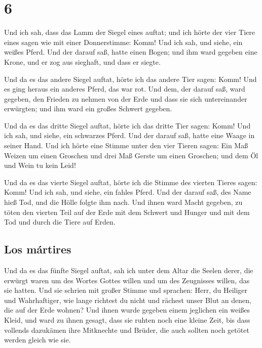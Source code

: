 \hypertarget{section-5}{%
\section{6}\label{section-5}}

 Und ich sah, dass das Lamm der Siegel eines auftat; und
ich hörte der vier Tiere eines sagen wie mit einer Donnerstimme: Komm!
 Und ich sah, und siehe, ein weißes Pferd. Und der darauf
saß, hatte einen Bogen; und ihm ward gegeben eine Krone, und er zog aus
sieghaft, und dass er siegte.

 Und da es das andere Siegel auftat, hörte ich das andere
Tier sagen: Komm!  Und es ging heraus ein anderes Pferd,
das war rot. Und dem, der darauf saß, ward gegeben, den Frieden zu
nehmen von der Erde und dass sie sich untereinander erwürgten; und ihm
ward ein großes Schwert gegeben.

 Und da es das dritte Siegel auftat, hörte ich das dritte
Tier sagen: Komm! Und ich sah, und siehe, ein schwarzes Pferd. Und der
darauf saß, hatte eine Waage in seiner Hand.  Und ich
hörte eine Stimme unter den vier Tieren sagen: Ein Maß Weizen um einen
Groschen und drei Maß Gerste um einen Groschen; und dem Öl und Wein tu
kein Leid!

 Und da es das vierte Siegel auftat, hörte ich die Stimme
des vierten Tieres sagen: Komm!  Und ich sah, und siehe,
ein fahles Pferd. Und der darauf saß, des Name hieß Tod, und die Hölle
folgte ihm nach. Und ihnen ward Macht gegeben, zu töten den vierten Teil
auf der Erde mit dem Schwert und Hunger und mit dem Tod und durch die
Tiere auf Erden.

\hypertarget{los-muxe1rtires}{%
\subsection{Los mártires}\label{los-muxe1rtires}}

 Und da es das fünfte Siegel auftat, sah ich unter dem
Altar die Seelen derer, die erwürgt waren um des Wortes Gottes willen
und um des Zeugnisses willen, das sie hatten.  Und sie
schrien mit großer Stimme und sprachen: Herr, du Heiliger und
Wahrhaftiger, wie lange richtest du nicht und rächest unser Blut an
denen, die auf der Erde wohnen?  Und ihnen wurde gegeben
einem jeglichen ein weißes Kleid, und ward zu ihnen gesagt, dass sie
ruhten noch eine kleine Zeit, bis dass vollends dazukämen ihre
Mitknechte und Brüder, die auch sollten noch getötet werden gleich wie
sie.


